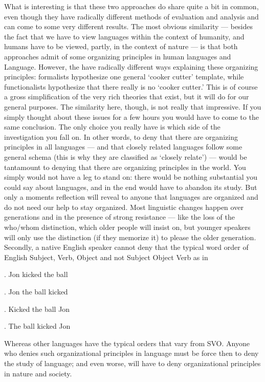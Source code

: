\documentclass[11pt]{book}%
\theoremstyle{plain}
\numberwithin{equation}{section}
\theoremstyle{definition}
\newtheorem{phrase string}{Phrase String}
\begin{document}
What is interesting is that these two approaches do share quite a bit in common, even though they have radically different methods of evaluation and analysis and can come to some very different results. The most obvious similarity --- besides the fact that we have to view languages within the context of humanity, and humans have to be viewed, partly, in the context of nature --- is that both approaches admit of some organizing principles in human languages and Language. However, the have radically different ways explaining these organizing principles: formalists hypothesize one general `cooker cutter' template, while functionalists hypothesize that there really is no `cooker cutter.' This is of course a gross simplification of the very rich theories that exist, but it will do for our general purposes. The similarity here, though, is not really that impressive. If you simply thought about these issues for a few hours you would have to come to the same conclusion. The only choice you really have is which side of the investigation you fall on. In other words, to deny that there are organizing principles in all languages --- and that closely related languages follow some general schema (this is why they are classified as `closely relate') --- would be tantamount to denying that there are organizing principles in the world. You simply would not have a leg to stand on: there would be nothing substantial you could say about languages, and in the end would have to abandon its study. But only a moments reflection will reveal to anyone that languages are organized and do not need our help to stay organized. Most linguistic changes happen over generations and in the presence of strong resistance --- like the loss of the who/whom distinction, which older people will insist on, but younger speakers will only use the distinction (if they memorize it) to please the older generation. Secondly, a native English speaker cannot deny that the typical word order of English Subject, Verb, Object and not Subject Object Verb as in

\ex. Jon kicked the ball 

\ex. Jon the ball kicked

\ex. Kicked the ball Jon

\ex. The ball kicked Jon

Whereas other languages have the typical orders that vary from SVO. Anyone who denies such organizational principles in language must be force then to deny the study of language; and even worse, will have to deny organizational principles in nature and society. 
\end{document}
